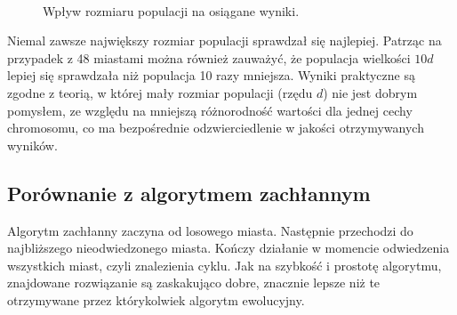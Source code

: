 \documentclass[12pt, a4paper]{article}
\begin{document}
\begin{figure}[H]
\centering
\mbox{\quad
{} 
}
\caption{Wpływ rozmiaru populacji na osiągane wyniki.}
\end{figure}

Niemal zawsze największy rozmiar populacji sprawdzał się najlepiej. Patrząc
na przypadek z 48 miastami można również zauważyć, że populacja wielkości $10d$
lepiej się sprawdzała niż populacja 10 razy mniejsza. Wyniki praktyczne są zgodne z teorią,
w której mały rozmiar populacji (rzędu $d$) nie jest dobrym pomysłem, ze względu na 
mniejszą różnorodność wartości dla jednej cechy chromosomu, co ma bezpośrednie odzwierciedlenie
w jakości otrzymywanych wyników.

\subsection{Porównanie z algorytmem zachłannym}

Algorytm zachłanny zaczyna od losowego miasta. Następnie przechodzi do najbliższego 
nieodwiedzonego miasta. Kończy działanie w momencie odwiedzenia wszystkich miast, czyli
znalezienia cyklu. Jak na szybkość i prostotę algorytmu, znajdowane rozwiązanie są zaskakująco 
dobre, znacznie lepsze niż te otrzymywane przez którykolwiek algorytm ewolucyjny.
\end{document}
